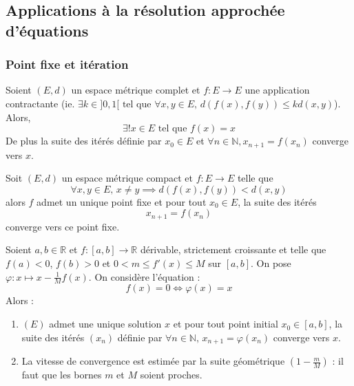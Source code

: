   \subsection{Applications à la résolution approchée d'équations}

  \subsubsection{Point fixe et itération}


  \begin{theorem}
    Soient $(E,d)$ un espace métrique complet et $f : E \rightarrow E$ une application contractante (ie. $\exists k \in ]0,1[ \text{ tel que } \forall x, y \in E, \, d(f(x), f(y)) \leq k d(x, y)$). Alors,
    \[ \exists! x \in E \text{ tel que } f(x) = x \]
    De plus la suite des itérés définie par $x_0 \in E$ et $\forall n \in \mathbb{N}, x_{n+1} = f(x_n)$ converge vers $x$.
  \end{theorem}

  \begin{theorem}
    Soit $(E,d)$ un espace métrique compact et $f : E \rightarrow E$ telle que
    \[ \forall x, y \in E, \, x \neq y \implies d(f(x), f(y)) < d(x,y) \]
    alors $f$ admet un unique point fixe et pour tout $x_0 \in E$, la suite des itérés
    \[ x_{n+1} = f(x_n) \]
    converge vers ce point fixe.
  \end{theorem}


  \begin{application}
    Soient $a, b \in \mathbb{R}$ et $f : [a, b] \rightarrow \mathbb{R}$ dérivable, strictement croissante et telle que $f(a) < 0$, $f(b) > 0$ et $0 < m \leq f'(x) \leq M$ sur $[a, b]$. On pose $\varphi : x \mapsto x - \frac{1}{M} f(x)$. On considère l'équation :
    \[ f(x) = 0 \iff \varphi(x) = x \tag{$E$} \]
    Alors :
    \begin{enumerate}[label={\bfseries(\roman*)}]
      \item $(E)$ admet une unique solution $x$ et pour tout point initial $x_0 \in [a, b]$, la suite des itérés $(x_n)$ définie par $\forall n \in \mathbb{N}, \, x_{n+1} = \varphi(x_n)$ converge vers $x$.
      \item La vitesse de convergence est estimée par la suite géométrique $\left( 1 - \frac{m}{M} \right)$ : il faut que les bornes $m$ et $M$ soient proches.
    \end{enumerate}
  \end{application}

